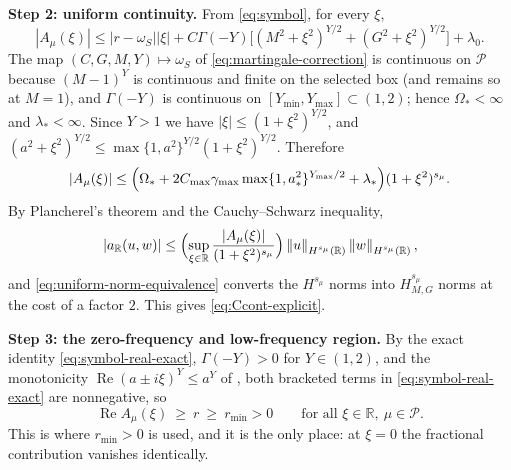 \documentclass[11pt]{amsart}
\theoremstyle{remark}
\newcommand{\R}{\mathbb{R}}
\newcommand{\Pset}{\mathcal{P}}
\newcommand{\norm}[1]{\left\lVert #1\right\rVert}
\newcommand{\rf}{r}
\DeclareMathOperator{\Real}{Re}
\begin{document}
\medskip\noindent
\textbf{Step 2: uniform continuity.}
From \eqref{eq:symbol}, for every $\xi$,
\[
  |A_\mu(\xi)|
  \le|\rf-\omega_S||\xi|
   +C\Gamma(-Y)\bigl[(M^2+\xi^2)^{Y/2}+(G^2+\xi^2)^{Y/2}\bigr]
   +\lambda_0 .
\]
The map $(C,G,M,Y)\mapsto\omega_S$ of \eqref{eq:martingale-correction} is
continuous on $\Pset$ because $(M-1)^Y$ is continuous and finite on the selected box
(and remains so at $M=1$), and $\Gamma(-Y)$ is continuous on $[Y_{\min},Y_{\max}]\subset(1,2)$;
hence $\Omega_\ast<\infty$ and $\lambda_\ast<\infty$.  Since $Y>1$ we have
$|\xi|\le(1+\xi^2)^{Y/2}$, and
$(a^2+\xi^2)^{Y/2}\le\max\{1,a^2\}^{Y/2}(1+\xi^2)^{Y/2}$.  Therefore
\begin{equation}
  |A_\mu(\xi)|
  \le\Bigl(\Omega_\ast+2C_{\max}\gamma_{\max}\max\{1,a_\ast^2\}^{Y_{\max}/2}
   +\lambda_\ast\Bigr)(1+\xi^2)^{s_\mu}.
  \label{eq:uniform-symbol-upper}
\end{equation}
By Plancherel's theorem and the Cauchy--Schwarz inequality,
\[
  |a_\R(u,w)|
  \le\Bigl(\sup_{\xi\in\R}\frac{|A_\mu(\xi)|}{(1+\xi^2)^{s_\mu}}\Bigr)
  \norm{u}_{H^{s_\mu}(\R)}\norm{w}_{H^{s_\mu}(\R)},
\]
and
\eqref{eq:uniform-norm-equivalence} converts the $H^{s_\mu}$ norms into
$H^{s_\mu}_{M,G}$ norms at the cost of a factor $2$.  This gives
\eqref{eq:Ccont-explicit}.

\medskip\noindent
\textbf{Step 3: the zero-frequency and low-frequency region.}
By the exact identity \eqref{eq:symbol-real-exact}, $\Gamma(-Y)>0$ for
$Y\in(1,2)$, and the monotonicity $\Real(a\pm i\xi)^Y\le a^Y$ of
\cite{DamircheliCGMY2026}, both bracketed terms in
\eqref{eq:symbol-real-exact} are nonnegative, so
\begin{equation}
  \Real A_\mu(\xi)\ \ge\ \rf\ \ge\ r_{\min}>0
  \qquad\text{for all }\xi\in\R,\ \mu\in\Pset .
  \label{eq:uniform-low-freq}
\end{equation}
This is where $r_{\min}>0$ is used, and it is the only place: at $\xi=0$ the
fractional contribution vanishes identically.
\end{document}
